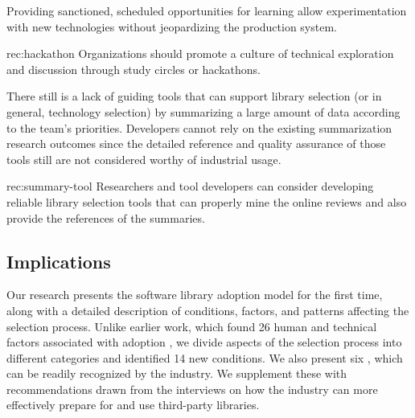 Providing sanctioned, scheduled opportunities for learning allow experimentation with new technologies without jeopardizing the production system.
  \begin{recommendation}{rec:hackathon}
  Organizations should promote a culture of technical exploration and discussion through study circles or hackathons.
\end{recommendation}

There still is a lack of guiding tools that can support library selection (or in general, technology selection) by summarizing a large amount of data according to the team's priorities. Developers cannot rely on the existing summarization research outcomes since the detailed reference and quality assurance of those tools still are not considered worthy of industrial usage.
  \begin{recommendation}{rec:summary-tool}
  Researchers and tool developers can consider developing reliable library selection tools that can properly mine the online reviews and also provide the references of the summaries.
\end{recommendation}

\subsection{Implications}
Our research presents the software library adoption model for the first time, along with a detailed description of conditions, factors, and patterns affecting the selection process. Unlike earlier work, which found 26 human and technical factors associated with adoption \cite{larios2020selecting}, we divide aspects of the selection process into different categories and identified 14 new conditions. 
We also present six \principle, which can be readily recognized by the industry. 
We supplement these with recommendations drawn from the interviews on how the industry can more effectively prepare for and use third-party libraries. 

